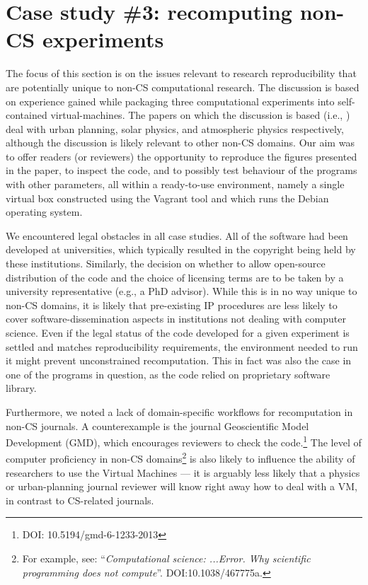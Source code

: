\section{Case study \#3: recomputing non-CS experiments}
\label{s:group3}

The focus of this section is on the issues relevant to research reproducibility that are potentially unique to non-CS computational research.
The discussion is based on experience gained while packaging three computational experiments into self-contained virtual-machines.
The papers on which the discussion is based (i.e., \cite{danielpaper,bareford2010nanoflare,arabas2013libcloud}) deal with urban planning, solar physics, and atmospheric physics respectively, although the discussion is likely relevant to other non-CS domains.
Our aim was to offer readers (or reviewers) the opportunity to reproduce the figures presented in the paper, to inspect the code, and to possibly test behaviour of the programs with other parameters, all within a ready-to-use environment, namely a single virtual box constructed using the Vagrant tool and which runs the Debian operating system.

%
We encountered legal obstacles in all case studies.
All of the software had been developed at universities, which typically resulted in the copyright being held by these institutions.
Similarly, the decision on whether to allow open-source distribution of the code and the choice of licensing terms are to be taken by a university representative (e.g., a PhD advisor).
While this is in no way unique to non-CS domains, it is likely that pre-existing IP procedures are less likely to cover software-dissemination aspects in institutions not dealing with computer science.
Even if the legal status of the code developed for a given experiment is settled and matches reproducibility requirements, the environment needed to run it might prevent unconstrained recomputation.
This in fact was also the case in one of the programs in question, as the code relied on proprietary software library.

Furthermore, we noted a lack of domain-specific workflows for recomputation in non-CS journals.
A counterexample is the journal Geoscientific Model Development (GMD), which encourages reviewers to check the code.\footnote{DOI: 10.5194/gmd-6-1233-2013 }
The level of computer proficiency in non-CS domains\footnote{For example, see: ``\emph{Computational science: ...Error. Why scientific programming does not compute}''. DOI:10.1038/467775a.} is also likely to influence the ability of researchers to use the Virtual Machines --- it is arguably less likely that a physics or urban-planning journal reviewer will know right away how to deal with a VM, in contrast to CS-related journals.

